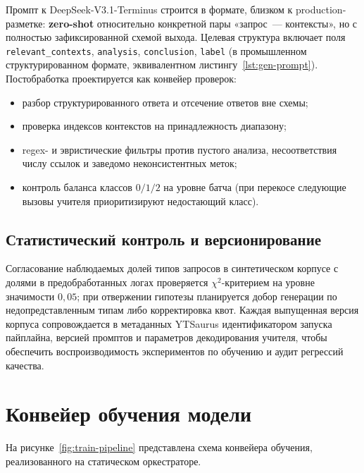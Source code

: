 \documentclass[times]{itmo-student-thesis}
\begin{document}
Промпт к DeepSeek-V3.1-Terminus строится в формате, близком к
production-разметке: \textbf{zero-shot} относительно конкретной пары
«запрос~--- контексты», но с полностью зафиксированной схемой выхода.
Целевая структура включает поля \texttt{relevant\_contexts},
\texttt{analysis}, \texttt{conclusion}, \texttt{label}
(в промышленном структурированном формате, эквивалентном листингу~\ref{lst:gen-prompt}).
Постобработка проектируется как конвейер проверок:
\begin{itemize}
    \item разбор структурированного ответа и отсечение ответов вне схемы;
    \item проверка индексов контекстов на принадлежность диапазону;
    \item regex- и эвристические фильтры против пустого анализа,
          несоответствия числу ссылок и заведомо неконсистентных меток;
    \item контроль баланса классов $0/1/2$ на уровне батча (при перекосе
          следующие вызовы учителя приоритизируют недостающий класс).
\end{itemize}

\subsection{Статистический контроль и версионирование}

Согласование наблюдаемых долей типов запросов в синтетическом корпусе
с долями в предобработанных логах проверяется $\chi^2$-критерием на
уровне значимости $0{,}05$; при отвержении гипотезы планируется
добор генерации по недопредставленным типам либо корректировка квот.
Каждая выпущенная версия корпуса сопровождается в метаданных YTSaurus
идентификатором запуска пайплайна, версией промптов и параметров
декодирования учителя, чтобы обеспечить воспроизводимость экспериментов
по обучению и аудит регрессий качества.

\section{Конвейер обучения модели}

На рисунке~\ref{fig:train-pipeline} представлена схема конвейера обучения,
реализованного на статическом оркестраторе.
\end{document}
